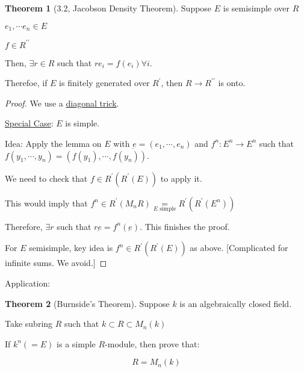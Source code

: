 \documentclass{article}
\theoremstyle{definition}
\newtheorem{theorem}{Theorem}
\begin{document}
\begin{theorem}
    [3.2, Jacobson Density Theorem]

    Suppose \(E\) is semisimple over \(R\)
    
    \(e_1, \cdots e_n \in E\)

    \(f\in R^{\prime\prime} \)

    Then, \(\exists r\in R\) such that \(r e_i = f(e_i) \forall i\).

    Therefoe, if \(E\) is finitely generated over \(R^{\prime}\), then \(R \to R^{\prime\prime} \) is onto. 
\end{theorem}

\begin{proof}
    We use a \underline{diagonal trick}.

    \underline{Special Case}: \(E\) is simple.

    Idea: Apply the lemma on \(E\) with \(\underbar{e} = (e_1, \cdots, e_n)\) and \(f^n : E^n \to E^n\) such that \(f(y_1,\cdots, y_n) = (f(y_1),\cdots, f(y_n))\). 

    We need to check that \(f\in R^{\prime} (R^{\prime} (E))\) to apply it.
    
    This would imply that \(f^n \in R^{\prime}(M_n R) \underset{E\text{ simple}}{=} R^{\prime} (R^{\prime} (E^n))\)
    
    Therefore, \(\exists r\) such that \(r \underbar{e} = f^n(\underbar{e})\). This finishes the proof.

    For \(E\) semisimple, key idea is \(f^n \in R^{\prime} (R^{\prime} (E))\) as above. [Complicated for infinite sums. We avoid.]

\end{proof}

Application:

\begin{theorem}
    [Burnside's Theorem] Suppose \(k\) is an algebraically closed field.

    Take subring \(R\) such that \(k \subset R \subset M_n(k)\)
    
    If \(k^n (=E)\) is a simple \(R\)-module, then prove that:

    \[
        R = M_n(k)
    \]
\end{theorem}
\end{document}
